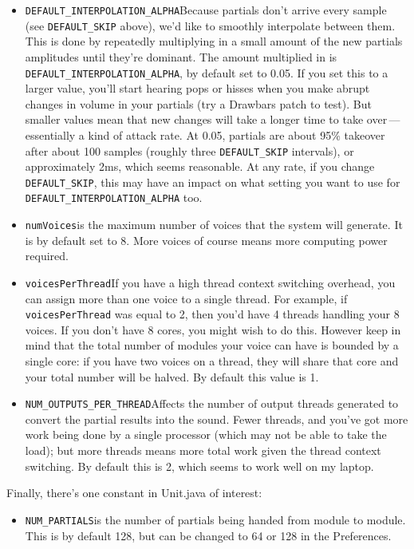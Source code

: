 \documentclass{article}
\begin{document}
\begin{itemize}
\item {\tt DEFAULT\_INTERPOLATION\_ALPHA}\qquad Because partials don't arrive every sample (see {\tt DEFAULT\_SKIP} above), we'd like to smoothly interpolate between them.  This is done by repeatedly multiplying in a small amount of the new partials amplitudes until they're dominant.  The amount multiplied in is {\tt DEFAULT\_INTERPOLATION\_ALPHA}, by default set to 0.05.  If you set this to a larger value, you'll start hearing pops or hisses when you make abrupt changes in volume in your partials (try a Drawbars patch to test).  But smaller values mean that new changes will take a longer time to take over\,---\,essentially a kind of attack rate.  At 0.05, partials are about 95\% takeover after about 100 samples (roughly three {\tt DEFAULT\_SKIP} intervals), or approximately 2ms, which seems reasonable.  At any rate, if you change {\tt DEFAULT\_SKIP}, this may have an impact on what setting you want to use for {\tt DEFAULT\_INTERPOLATION\_ALPHA} too.

\item {\tt numVoices}\qquad is the maximum number of voices that the system will generate.  It is by default set to 8.  More voices of course means more computing power required.

\item {\tt voicesPerThread}\qquad If you have a high thread context switching overhead, you can assign more than one voice to a single thread.  For example, if {\tt voicesPerThread} was equal to 2, then you'd have 4 threads handling your 8 voices.  If you don't have 8 cores, you might wish to do this.  However keep in mind that the total number of modules your voice can have is bounded by a single core: if you have two voices on a thread, they will share that core and your total number will be halved.  By default this value is 1.

\item {\tt NUM\_OUTPUTS\_PER\_THREAD}\qquad Affects the number of output threads generated to convert the partial results into the sound.  Fewer threads, and you've got more work being done by a single processor (which may not be able to take the load); but more threads means more total work given the thread context switching.  By default this is 2, which seems to work well on my laptop.

\end{itemize}

Finally, there's one constant in Unit.java of interest:

\begin{itemize}
\item {\tt NUM\_PARTIALS}\qquad is the number of partials being handed from module to module.  This is by default 128, but can be changed to 64 or 128 in the Preferences. 
\end{itemize}
\end{document}
